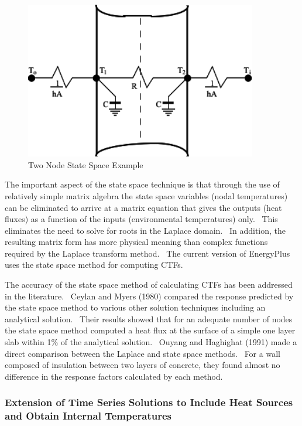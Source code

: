 \begin{figure}[hbtp] %
\centering
\includegraphics[width=0.9\textwidth, height=0.9\textheight, keepaspectratio=true]{media/image6008.svg.png}
\caption{Two Node State Space Example \protect \label{fig:two-node-state-space-example}}
\end{figure}

The important aspect of the state space technique is that through the use of relatively simple matrix algebra the state space variables (nodal temperatures) can be eliminated to arrive at a matrix equation that gives the outputs (heat fluxes) as a function of the inputs (environmental temperatures) only.~ This eliminates the need to solve for roots in the Laplace domain.~ In addition, the resulting matrix form has more physical meaning than complex functions required by the Laplace transform method.~ The current version of EnergyPlus uses the state space method for computing CTFs.

The accuracy of the state space method of calculating CTFs has been addressed in the literature.~ Ceylan and Myers (1980) compared the response predicted by the state space method to various other solution techniques including an analytical solution.~ Their results showed that for an adequate number of nodes the state space method computed a heat flux at the surface of a simple one layer slab within 1\% of the analytical solution.~ Ouyang and Haghighat (1991) made a direct comparison between the Laplace and state space methods.~ For a wall composed of insulation between two layers of concrete, they found almost no difference in the response factors calculated by each method.

\subsubsection{Extension of Time Series Solutions to Include Heat Sources and Obtain Internal Temperatures}\label{extension-of-time-series-solutions-to-include-heat-sources-and-obtain-internal-temperatures}

